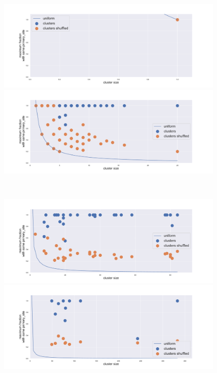 \begin{figure}[htb!]
	\centering
	\begin{minipage}{0.45\textwidth}
		\includegraphics[width=0.9\linewidth]{pictures/topic/gtex/oversigma_10tissue/shuffledclusterhomosize_l0_primary_site.pdf}
	\end{minipage}
	\hspace{3mm}
	\begin{minipage}{0.45\textwidth}
		\includegraphics[width=0.9\linewidth]{pictures/topic/gtex/oversigma_10tissue/shuffledclusterhomosize_l1_primary_site.pdf}
	\end{minipage}
	\\
	\begin{minipage}{0.45\textwidth}
		\includegraphics[width=0.9\linewidth]{pictures/topic/gtex/oversigma_10tissue/shuffledclusterhomosize_l2_primary_site.pdf}
	\end{minipage}
	\hspace{3mm}
	\begin{minipage}{0.45\textwidth}
		\includegraphics[width=0.9\linewidth]{pictures/topic/gtex/oversigma_10tissue/shuffledclusterhomosize_l3_primary_site.pdf}

\end{minipage}
\end{figure}

